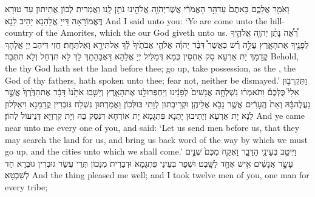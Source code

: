{וָאֹמַ֖ר אֲלֵכֶ֑ם בָּאתֶם֙ עַד\maqqaf הַ֣ר הָאֱמֹרִ֔י אֲשֶׁר\maqqaf יְהֹוָ֥ה אֱלֹהֵ֖ינוּ נֹתֵ֥ן לָֽנוּ׃}
{וַאֲמַרִית לְכוֹן אֲתֵיתוּן עַד טוּרָא דֶּאֱמוֹרָאָה דַּייָ אֱלָהַנָא יָהֵיב לַנָא׃}
{And I said unto you: ‘Ye are come unto the hill-country of the Amorites, which the \lord\space our God giveth unto us.}{}
{רְ֠אֵ֠ה נָתַ֨ן יְהֹוָ֧ה אֱלֹהֶ֛יךָ לְפָנֶ֖יךָ אֶת\maqqaf הָאָ֑רֶץ עֲלֵ֣ה רֵ֗שׁ כַּאֲשֶׁר֩ דִּבֶּ֨ר יְהֹוָ֜ה אֱלֹהֵ֤י אֲבֹתֶ֙יךָ֙ לָ֔ךְ אַל\maqqaf תִּירָ֖א וְאַל\maqqaf תֵּחָֽת׃}
{חֲזִי דִּיהַב יְיָ אֱלָהָךְ קֳדָמָךְ יָת אַרְעָא סַק אַחְסֵין כְּמָא דְּמַלֵּיל יְיָ אֱלָהָא דַּאֲבָהָתָךְ לָךְ לָא תִּדְחַל וְלָא תִתְּבַר׃}
{Behold, the \lord\space thy God hath set the land before thee; go up, take possession, as the \lord, the God of thy fathers, hath spoken unto thee; fear not, neither be dismayed.’}{}
{וַתִּקְרְב֣וּן אֵלַי֮ כֻּלְּכֶם֒ וַתֹּאמְר֗וּ נִשְׁלְחָ֤ה אֲנָשִׁים֙ לְפָנֵ֔ינוּ וְיַחְפְּרוּ\maqqaf לָ֖נוּ אֶת\maqqaf הָאָ֑רֶץ וְיָשִׁ֤בוּ אֹתָ֙נוּ֙ דָּבָ֔ר אֶת\maqqaf הַדֶּ֙רֶךְ֙ אֲשֶׁ֣ר נַעֲלֶה\maqqaf בָּ֔הּ וְאֵת֙ הֶֽעָרִ֔ים אֲשֶׁ֥ר נָבֹ֖א אֲלֵיהֶֽן׃}
{וּקְרֵיבְתּוּן לְוָתִי כּוּלְּכוֹן וַאֲמַרְתּוּן נִשְׁלַח גּוּבְרִין קֳדָמַנָא וִיאַלְּלוּן לַנָא יָת אַרְעָא וְיָתִיבוּן יָתַנָא פִּתְגָמָא יָת אוֹרְחָא דְּנִסַּק בַּהּ וְיָת קִרְוַיָּא דְּנֵיעוֹל לְהוֹן׃}
{And ye came near unto me every one of you, and said: ‘Let us send men before us, that they may search the land for us, and bring us back word of the way by which we must go up, and the cities unto which we shall come.’}{}
{וַיִּיטַ֥ב בְּעֵינַ֖י הַדָּבָ֑ר וָאֶקַּ֤ח מִכֶּם֙ שְׁנֵ֣ים עָשָׂ֣ר אֲנָשִׁ֔ים אִ֥ישׁ אֶחָ֖ד לַשָּֽׁבֶט׃}
{וּשְׁפַר בְּעֵינַי פִּתְגָמָא וּדְבַרִית מִנְּכוֹן תְּרֵי עֲשַׂר גּוּבְרִין גּוּבְרָא חַד לְשִׁבְטָא׃}
{And the thing pleased me well; and I took twelve men of you, one man for every tribe;}{}
